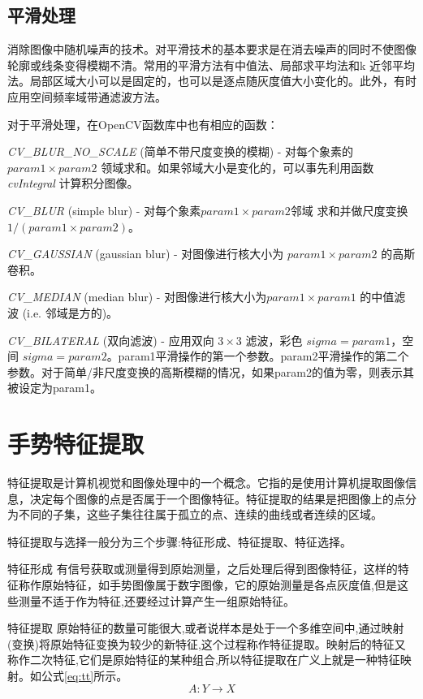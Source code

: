\documentclass{XDBAthesis}
\begin{document}
\subsection{平滑处理}

消除图像中随机噪声的技术。对平滑技术的基本要求是在消去噪声的同时不使图像轮廓或线条变得模糊不清。常用的平滑方法有中值法、局部求平均法和k 近邻平均法。局部区域大小可以是固定的，也可以是逐点随灰度值大小变化的。此外，有时应用空间频率域带通滤波方法。

对于平滑处理，在OpenCV函数库中也有相应的函数\cite{王昭威2013基于}：

\emph{CV\_BLUR\_NO\_SCALE} (简单不带尺度变换的模糊) - 对每个象素的 $param1\times param2$ 领域求和。如果邻域大小是变化的，可以事先利用函数 \emph{cvIntegral} 计算积分图像。

\emph{CV\_BLUR} (simple blur) - 对每个象素$param1\times param2$邻域 求和并做尺度变换 $1/(param1\times param2)$。

\emph{CV\_GAUSSIAN} (gaussian blur) - 对图像进行核大小为 $param1\times param2$ 的高斯卷积。

\emph{CV\_MEDIAN} (median blur) - 对图像进行核大小为$param1\times param1$ 的中值滤波 (i.e. 邻域是方的)。

\emph{CV\_BILATERAL} (双向滤波) - 应用双向 $3\times 3$ 滤波，彩色 $sigma=param1$，空间 $sigma=param2$。param1平滑操作的第一个参数。param2平滑操作的第二个参数。对于简单/非尺度变换的高斯模糊的情况，如果param2的值为零，则表示其被设定为param1。

\section{手势特征提取}

    特征提取是计算机视觉和图像处理中的一个概念。它指的是使用计算机提取图像信息，决定每个图像的点是否属于一个图像特征。特征提取的结果是把图像上的点分为不同的子集，这些子集往往属于孤立的点、连续的曲线或者连续的区域。

特征提取与选择一般分为三个步骤:特征形成、特征提取、特征选择。

特征形成  有信号获取或测量得到原始测量，之后处理后得到图像特征，这样的特征称作原始特征，如手势图像属于数字图像，它的原始测量是各点灰度值,但是这些测量不适于作为特征,还要经过计算产生一组原始特征。

     特征提取  原始特征的数量可能很大,或者说样本是处于一个多维空间中,通过映射(变换)将原始特征变换为较少的新特征,这个过程称作特征提取。映射后的特征又称作二次特征,它们是原始特征的某种组合,所以特征提取在广义上就是一种特征映射。如公式\eqref{eq:tt}所示。
\begin{equation}
    A:Y\rightarrow X
    \label{eq:tt}
\end{equation}
\end{document}

